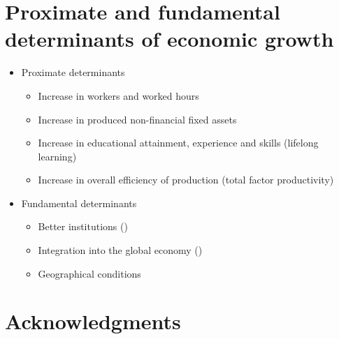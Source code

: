 \documentclass[
  ignorenonframetext,
]{beamer}
\providecommand{\tightlist}{%
  \setlength{\itemsep}{0pt}\setlength{\parskip}{0pt}}\usepackage{longtable,booktabs,array}
\begin{document}
\section{Proximate and fundamental determinants of economic
growth}\label{proximate-and-fundamental-determinants-of-economic-growth}

\begin{frame}{}
\label{section-15}
\begin{itemize}
\item
  Proximate determinants

  \begin{itemize}
  \tightlist
  \item
    Increase in workers and worked hours
  \item
    Increase in produced non-financial fixed assets
  \item
    Increase in educational attainment, experience and skills (lifelong
    learning)
  \item
    Increase in overall efficiency of production (total factor
    productivity)
  \end{itemize}
\end{itemize}
\end{frame}

\begin{frame}{}
\label{section-16}
\begin{itemize}
\item
  Fundamental determinants

  \begin{itemize}
  \tightlist
  \item
    Better institutions
    ()
  \item
    Integration into the global economy
    ()
  \item
    Geographical conditions
  \end{itemize}
\end{itemize}
\end{frame}

\section{Acknowledgments}\label{acknowledgments}
\end{document}
